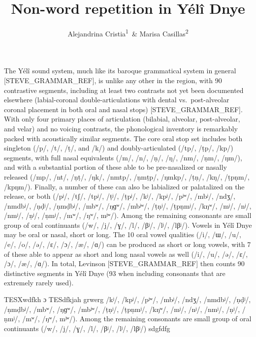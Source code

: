 \documentclass[english,,man,floatsintext]{apa6}
\title{Non-word repetition in Yélî Dnye}
\author{Alejandrina Cristia\textsuperscript{1}~\& Marisa
Casillas\textsuperscript{2}}
\date{}
\begin{document}
\maketitle

The Yélî sound system, much like its baroque grammatical system in
general {[}STEVE\_GRAMMAR\_REF{]}, is unlike any other in the region,
with 90 contrastive segments, including at least two contrasts not yet
been documented elsewhere (labial-coronal double-articulations with
dental vs.~post-alveolar coronal placement in both oral and nasal stops)
{[}STEVE\_GRAMMAR\_REF{]}. With only four primary places of articulation
(bilabial, alveolar, post-alveolar, and velar) and no voicing contrasts,
the phonological inventory is remarkably packed with acoustically
similar segments. The core oral stop set includes both singleton (/p/,
/t/, /ṭ/, and /k/) and doubly-articulated (/tp/, /ṭp/, /kp/) segments,
with full nasal equivalents (/m/, /n/, /ṇ/, /ŋ/, /nm/, /ṇm/, /ŋm/), and
with a substantial portion of these able to be pre-nasalized or nasally
released (/mp/, /nt/, /ṇṭ/, /ŋk/, /nmtp/, /ṇmṭp/, /ŋmkp/, /ṭṇ/, /kŋ/,
/ṭpṇm/, /kpŋm/). Finally, a number of these can also be labialized or
palatalized on the release, or both (/pʲ/, /tʃ/, /tpʲ/, /ṭʲ/, /ṭpʲ/,
/kʲ/, /kpʲ/, /pʲʷ/, /mbʲ/, /ndʒ/, /nmdbʲ/, /ṇḍʲ/, /ṇmḍbʲ/, /mbʷ/, /ŋɡʷ/,
/mbʲʷ/, /ṭṇʲ/, /ṭpṇmʲ/, /kŋʷ/, /mʲ/, /nʲ/, /nmʲ/, /ṇʲ/, /ṇmʲ/, /mʷ/,
/ŋʷ/, mʲʷ/). Among the remaining consonants are small group of oral
continuants (/w/, /j/, /ɣ/, /l/, /βʲ/, /lʲ/, /lβʲ/). Vowels in Yélî Dnye
may be oral or nasal, short or long. The 10 oral vowel qualities (/i/,
/ɯ/, /u/, /e/, /o/, /ə/, /ɛ/, /ɔ/, /æ/, /ɑ/) can be produced as short or
long vowels, with 7 of these able to appear as short and long nasal
vowels as well (/i/, /u/, /ə/, /ɛ/, /ɔ/, /æ/, /ɑ/). In total, Levinson
{[}STEVE\_GRAMMAR\_REF{]} then counts 90 distinctive segments in Yélî
Dnye (93 when including consonants that are extremely rarely used).

TESXwdfkh ɔ TESdfkjah grwerg /kʲ/, /kpʲ/, /pʲʷ/, /mbʲ/, /ndʒ/, /nmdbʲ/,
/ṇḍʲ/, /ṇmḍbʲ/, /mbʷ/, /ŋɡʷ/, /mbʲʷ/, /ṭṇʲ/, /ṭpṇmʲ/, /kŋʷ/, /mʲ/, /nʲ/,
/nmʲ/, /ṇʲ/, /ṇmʲ/, /mʷ/, /ŋʷ/, mʲʷ/). Among the remaining consonants
are small group of oral continuants (/w/, /j/, /ɣ/, /l/, /βʲ/, /lʲ/,
/lβʲ/) sdgfdfg

\setlength{\parindent}{-0.5in} \setlength{\leftskip}{0.5in}
\end{document}
